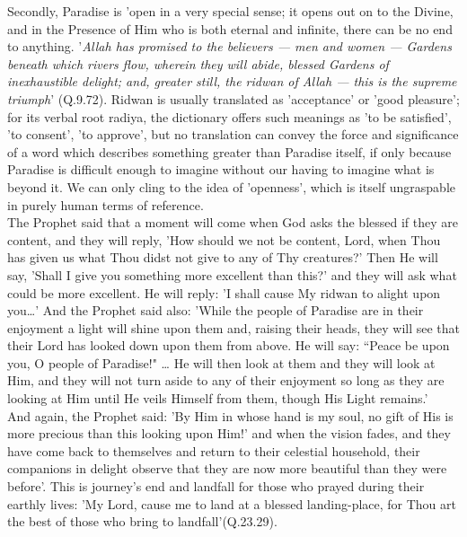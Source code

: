 \documentclass[10pt, twoside]{book}
\begin{document}
Secondly, Paradise is 'open in a very special sense; it opens out on to the Divine, and in the 
Presence of Him who is both eternal and infinite, there can be no end to anything. '\emph{Allah has 
promised to the believers --- men and women --- Gardens beneath which rivers flow, wherein they will 
abide, blessed Gardens of inexhaustible delight; and, greater still, the ridwan of Allah --- this is 
the supreme triumph}' (Q.9.72). Ridwan is usually translated as 'acceptance' or 'good pleasure'; for 
its verbal root radiya, the dictionary offers such meanings as 'to be satisfied', 'to consent', 'to 
approve', but no translation can convey the force and significance of a word which describes 
something greater than Paradise itself, if only because Paradise is difficult enough to imagine 
without our having to imagine what is beyond it. We can only cling to the idea of 'openness', which 
is itself ungraspable in purely human terms of reference. \\

The Prophet said that a moment will come when God asks the blessed if they are content, and they will 
reply, 'How should we not be content, Lord, when Thou has given us what Thou didst not give to any of 
Thy creatures?' Then He will say, 'Shall I give you something more excellent than this?' and they 
will ask what could be more excellent. He will reply: 'I shall cause My ridwan to alight upon you\ldots{}' 
And the Prophet said also: 'While the people of Paradise are in their enjoyment a light will shine 
upon them and, raising their heads, they will see that their Lord has looked down upon them from 
above. He will say: ``Peace be upon you, O people of Paradise!" \ldots{} He will then look at them and they 
will look at Him, and they will not turn aside to any of their enjoyment so long as they are looking 
at Him until He veils Himself from them, though His Light remains.' \\

And again, the Prophet said: 'By Him in whose hand is my soul, no gift of His is more precious than 
this looking upon Him!' and when the vision fades, and they have come back to themselves and return 
to their celestial household, their companions in delight observe that they are now more beautiful 
than they were before'. This is journey's end and landfall for those who prayed during their earthly 
lives: 'My Lord, cause me to land at a blessed landing-place, for Thou art the best of those who 
bring to landfall'(Q.23.29). \\
\end{document}
